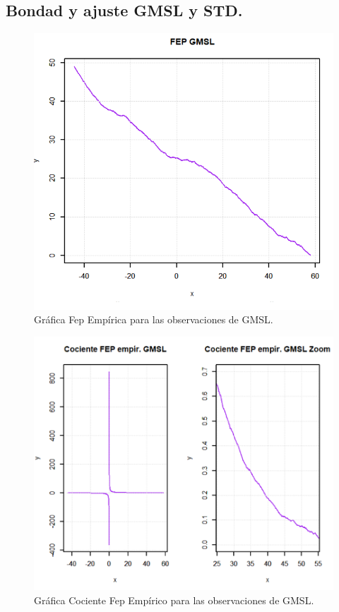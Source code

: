 \documentclass[10.5pt,notitlepage]{article}
\theoremstyle{plain}
\begin{document}
\subsection{Bondad y ajuste GMSL y STD.}
\begin{figure}[htb]
    \centering
    \includegraphics[scale = 0.4]{Incisob/FepGMSL.png}
    \caption{Gráfica Fep Empírica para las observaciones de GMSL. }
    \label{fig:2}
\end{figure}

\begin{figure}[htb]
    \centering
    \includegraphics[scale = 0.4]{Incisob/CocFepGmls.png}
    \caption{Gráfica Cociente Fep Empírico para las observaciones de GMSL. }
    \label{fig:3}
\end{figure}
\end{document}
